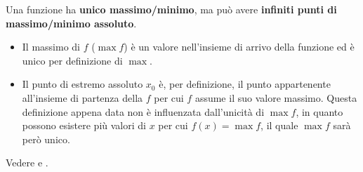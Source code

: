 \begin{observation}
	\label{obs:inf_pti_max_min_abs}
	Una funzione ha \textbf{unico massimo/minimo}, ma può avere \textbf{infiniti punti di massimo/minimo assoluto}.
	\begin{itemize}
		\item Il massimo di $f$ ($\max f$) è un valore nell'insieme di arrivo della funzione ed è unico per definizione di $\max$.
		\item Il punto di estremo assoluto $x_0$ è, per definizione, il punto appartenente all'insieme di partenza della $f$ per cui $f$ assume il suo valore massimo. Questa definizione appena data non è influenzata dall'unicità di $\max f$, in quanto possono esistere più valori di $x$ per cui $f(x) = \max f$, il quale $\max f$ sarà però unico.
	\end{itemize}
	Vedere  e .
\end{observation}
